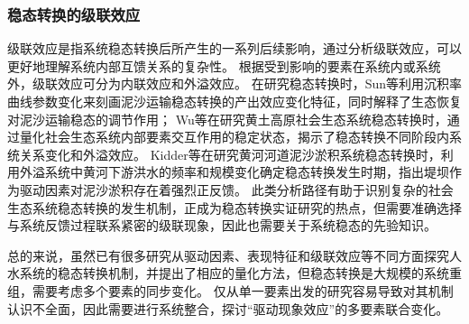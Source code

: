 \subsubsection{稳态转换的级联效应}

级联效应是指系统稳态转换后所产生的一系列后续影响，通过分析级联效应，可以更好地理解系统内部互馈关系的复杂性\cite{rocha2018}。
根据受到影响的要素在系统内或系统外，级联效应可分为内联效应和外溢效应\cite{rocha2018}。
在研究稳态转换时，Sun等利用沉积率曲线参数变化来刻画泥沙运输稳态转换的产出效应变化特征，同时解释了生态恢复对泥沙运输稳态的调节作用\cite{sun2020}；
Wu等在研究黄土高原社会\textendash{}生态系统稳态转换时，通过量化社会\textendash{}生态系统内部要素交互作用的稳定状态，揭示了稳态转换不同阶段内系统关系变化和外溢效应\cite{wu2020a}。
Kidder等在研究黄河河道泥沙淤积系统稳态转换时，利用外溢系统中黄河下游洪水的频率和规模变化确定稳态转换发生时期，指出堤坝作为驱动因素对泥沙淤积存在着强烈正反馈\cite{kidder2015}。
此类分析路径有助于识别复杂的社会\textendash{}生态系统稳态转换的发生机制，正成为稳态转换实证研究的热点，但需要准确选择与系统反馈过程联系紧密的级联现象，因此也需要关于系统稳态的先验知识。

总的来说，虽然已有很多研究从驱动因素、表现特征和级联效应等不同方面探究人水系统的稳态转换机制，并提出了相应的量化方法，但稳态转换是大规模的系统重组，需要考虑多个要素的同步变化。
仅从单一要素出发的研究容易导致对其机制认识不全面，因此需要进行系统整合，探讨“驱动\textendash{}现象\textendash{}效应”的多要素联合变化。
